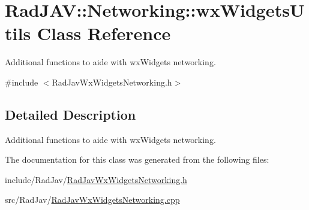 \hypertarget{class_rad_j_a_v_1_1_networking_1_1wx_widgets_utils}{}\section{Rad\+J\+AV\+:\+:Networking\+:\+:wx\+Widgets\+Utils Class Reference}
\label{class_rad_j_a_v_1_1_networking_1_1wx_widgets_utils}


Additional functions to aide with wx\+Widgets networking.  




{\ttfamily \#include $<$Rad\+Jav\+Wx\+Widgets\+Networking.\+h$>$}



\subsection{Detailed Description}
Additional functions to aide with wx\+Widgets networking. 

The documentation for this class was generated from the following files\+:\begin{DoxyCompactItemize}
\item 
include/\+Rad\+Jav/\hyperlink{_rad_jav_wx_widgets_networking_8h}{Rad\+Jav\+Wx\+Widgets\+Networking.\+h}\item 
src/\+Rad\+Jav/\hyperlink{_rad_jav_wx_widgets_networking_8cpp}{Rad\+Jav\+Wx\+Widgets\+Networking.\+cpp}\end{DoxyCompactItemize}
